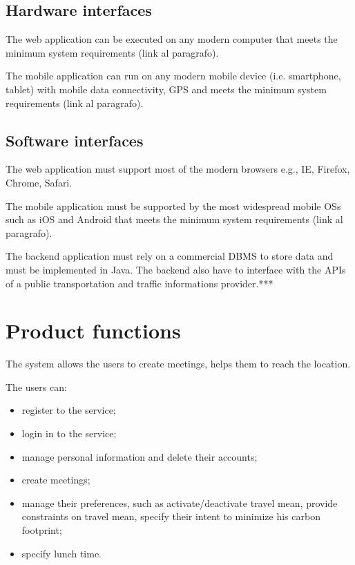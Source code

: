\documentclass{report}
\begin{document}
	\subsection{Hardware interfaces}
	The web application can be executed on any modern computer that meets the minimum system requirements (link al paragrafo).
	
	\bigskip
	The mobile application can run on any modern mobile device (i.e. smartphone, tablet) with mobile data connectivity,  GPS and meets the minimum system requirements (link al paragrafo).


	\subsection{Software interfaces}
	The web application must support most of the modern browsers e.g., IE, Firefox, Chrome, Safari.
	
	\bigskip
	The mobile application must be supported by the most widespread mobile OSs such as iOS and Android that meets the minimum system requirements (link al paragrafo).

	\bigskip
	The backend application must rely on a commercial DBMS to store data and must be implemented in Java.
	The backend also have to interface with the APIs of a public transportation and  traffic informations provider.***
	
	
	\section{Product functions}
	The system allows the users to create meetings, helps them to reach the location.
	
	The users can:
	\begin{itemize}
	\item register to the service;
	\item login in to the service;
	\item manage personal information and delete their accounts;
	\item create meetings;
	\item manage their preferences, such as activate/deactivate travel mean, provide constraints on travel mean, specify their intent to minimize his carbon footprint;
	\item specify lunch time.
	\end{itemize}
	
\end{document}
